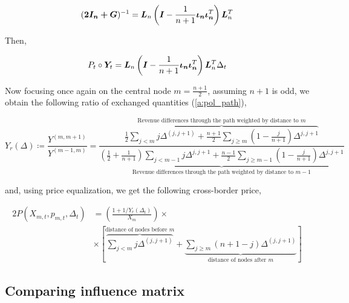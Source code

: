 \begin{equation}
  (\bm{2I_n + \bm{G}})^{-1} = \bm{L}_n  \left(\bm{I} - \frac{1}{n+1} \bm{\iota_n \iota_n}^T\right) \bm{L}_n^T
\end{equation}

Then,

\begin{equation*}
  \begin{split}
    P_t \circ \bm{Y}_t &= \bm{L}_n  \left(\bm{I} - \frac{1}{n+1} \bm{\iota_n \iota_n}^T\right) \bm{L}_n^T  \Delta_t \\
  \end{split}
\end{equation*}

Now focusing once again on the central node $m = \frac{n+1}{2}$, assuming $n+1$ is odd, we obtain the following ratio of exchanged quantities (\ref{a:pol_path}),

\begin{equation}
  Y_r(\Delta) \coloneqq \frac{Y^{(m, m+1)}}{Y^{(m-1, m)}}
  = \frac{
    \overbrace{\frac{1}{2} \sum_{j < m} j \Delta^{(j, j+1)} + \frac{n+1}{2}\sum_{j \geq m} \left(1 - \frac{j}{n+1}\right) \Delta^{j, j+1}}^{\text{Revenue differences through the path weighted by distance to } m}
  }{
    \underbrace{\left(\frac{1}{2} + \frac{1}{n+1}\right) \sum_{j < m-1} j \Delta^{j, j+1}+ \frac{n-1}{2} \sum_{j \geq m-1} \left(1 - \frac{j}{n+1}\right) \Delta^{j, j+1}}_{\text{Revenue differences through the path weighted by distance to } m-1}
  }
\end{equation}

and, using price equalization, we get the following cross-border price,

\begin{equation} \label{policy_path}
  \begin{split}
    2 P(X_{m, t}, p_{m, t}, \Delta_t) &= \left( \frac{1 + 1 / Y_r(\Delta_t)}{X_m} \right) \times  \\
    &\times \left[ \overbrace{\sum_{j < m} j \Delta^{(j, j + 1)}}^{\text{distance of nodes before } m} +  \underbrace{\sum_{j \geq m}\left(n + 1 - j\right) \Delta^{(j, j + 1)}}_{\text{distance of nodes after } m} \right]
  \end{split}
\end{equation}


\subsection{Comparing influence matrix}

